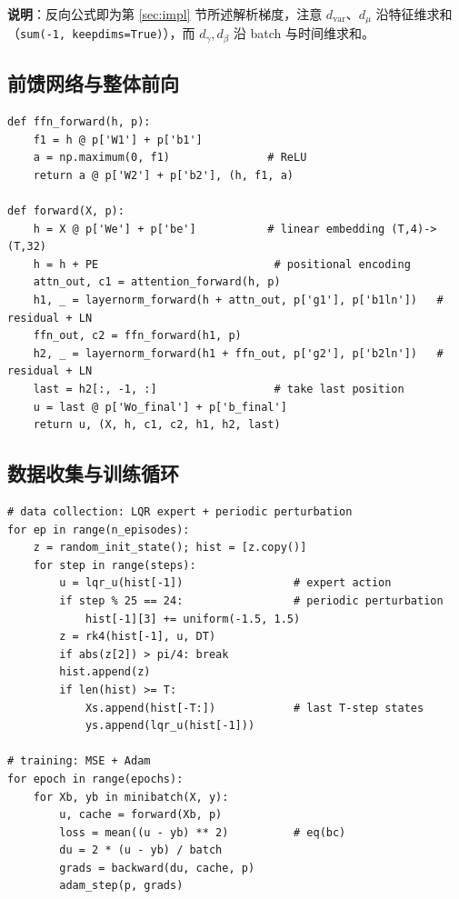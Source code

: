 \documentclass[11pt,a4paper]{article}
\begin{document}
\textbf{说明}：反向公式即为第 \ref{sec:impl} 节所述解析梯度，注意 $d_{\mathrm{var}}$、$d_\mu$ 沿特征维求和（\texttt{sum(-1, keepdims=True)}），而 $d_\gamma, d_\beta$ 沿 batch 与时间维求和。

\subsection{前馈网络与整体前向}

\begin{lstlisting}
def ffn_forward(h, p):
    f1 = h @ p['W1'] + p['b1']
    a = np.maximum(0, f1)               # ReLU
    return a @ p['W2'] + p['b2'], (h, f1, a)

def forward(X, p):
    h = X @ p['We'] + p['be']           # linear embedding (T,4)->(T,32)
    h = h + PE                           # positional encoding
    attn_out, c1 = attention_forward(h, p)
    h1, _ = layernorm_forward(h + attn_out, p['g1'], p['b1ln'])   # residual + LN
    ffn_out, c2 = ffn_forward(h1, p)
    h2, _ = layernorm_forward(h1 + ffn_out, p['g2'], p['b2ln'])   # residual + LN
    last = h2[:, -1, :]                  # take last position
    u = last @ p['Wo_final'] + p['b_final']
    return u, (X, h, c1, c2, h1, h2, last)
\end{lstlisting}

\subsection{数据收集与训练循环}

\begin{lstlisting}
# data collection: LQR expert + periodic perturbation
for ep in range(n_episodes):
    z = random_init_state(); hist = [z.copy()]
    for step in range(steps):
        u = lqr_u(hist[-1])                 # expert action
        if step % 25 == 24:                 # periodic perturbation
            hist[-1][3] += uniform(-1.5, 1.5)
        z = rk4(hist[-1], u, DT)
        if abs(z[2]) > pi/4: break
        hist.append(z)
        if len(hist) >= T:
            Xs.append(hist[-T:])            # last T-step states
            ys.append(lqr_u(hist[-1]))

# training: MSE + Adam
for epoch in range(epochs):
    for Xb, yb in minibatch(X, y):
        u, cache = forward(Xb, p)
        loss = mean((u - yb) ** 2)          # eq(bc)
        du = 2 * (u - yb) / batch
        grads = backward(du, cache, p)
        adam_step(p, grads)
\end{lstlisting}
\end{document}
